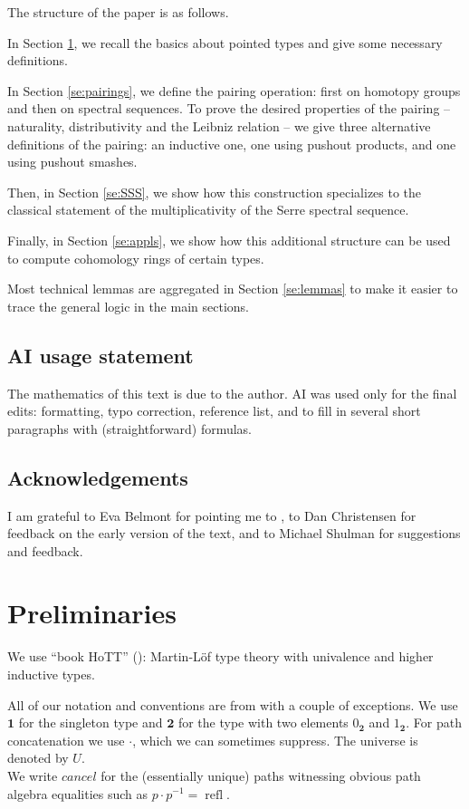 \documentclass{amsart}
\theoremstyle{definition}
\newcommand{\refl}{\operatorname{refl}}
\newcommand{\sgtn}{\mathbf{1}}
\newcommand{\s}{\mathbf{2}}
\begin{document}
The structure of the paper is as follows.

In Section \ref{se:prelim}, we recall the basics about pointed types and give some necessary definitions.

In Section \ref{se:pairings}, we define the pairing operation: first on homotopy groups and then on spectral sequences. To prove the desired properties of the pairing -- naturality, distributivity and the Leibniz relation -- we give three alternative definitions of the pairing: an inductive one, one using pushout products, and one using pushout smashes.

Then, in Section \ref{se:SSS}, we show how this construction specializes to the classical statement of the multiplicativity of the Serre spectral sequence.

Finally, in Section \ref{se:appls}, we show how this additional structure can be used to compute cohomology rings of certain types.

Most technical lemmas are aggregated in Section \ref{se:lemmas} to make it easier to trace the general logic in the main sections.

\subsection*{AI usage statement}

The mathematics of this text is due to the author. AI was used only for the final edits: formatting, typo correction, reference list, and to fill in several short paragraphs with (straightforward) formulas.

\subsection*{Acknowledgements}

I am grateful to Eva Belmont for pointing me to \cite{Dug1}, to Dan Christensen for feedback on the early version of the text, and to Michael Shulman for suggestions and feedback.

\section{Preliminaries}\label{se:prelim}

We use ``book HoTT'' (\cite{UF}): Martin-L\"of type theory with univalence and higher inductive types.

All of our notation and conventions are from \cite{UF} with a couple of exceptions. We use $\sgtn$ for the singleton type and $\s$ for the type with two elements $0_{\s}$ and $1_\s$. For path concatenation we use $\cdot$, which we can sometimes suppress.
The universe is denoted by $U$.
\\
We write $cancel$ for the (essentially unique) paths witnessing obvious path algebra equalities such as $p \cdot p^{-1} = \refl$.
\end{document}
